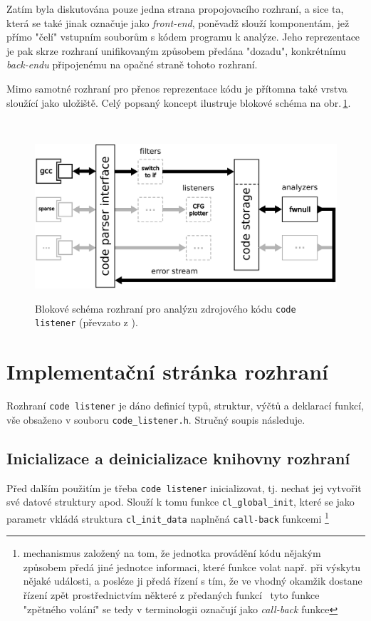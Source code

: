 Zatím byla diskutována pouze jedna strana propojovacího rozhraní, a sice
ta, která se také jinak označuje jako \emph{front-end}, poněvadž slouží
komponentám, jež přímo "čelí" vstupním souborům s kódem programu
k analýze. Jeho reprezentace je pak skrze rozhraní unifikovaným způsobem
předána "dozadu", konkrétnímu \emph{back-endu} připojenému na opačné straně
tohoto rozhraní.

Mimo samotné rozhraní pro přenos reprezentace kódu je přítomna
také vrstva sloužící jako uložiště. Celý popsaný koncept ilustruje
blokové schéma na obr.\,\ref{fig:code-listener:api}.

\hspace*{\fill}\\[-\baselineskip]
\begin{figure}[!h]
    \begin{center}
        \includegraphics[width=1\textwidth,keepaspectratio]{fig/cl-block-diagram}
        \label{fig:code-listener:api}
        \caption{Blokové schéma rozhraní pro analýzu zdrojového kódu
                 \texttt{code listener} (převzato z \cite{web:FITVUTBR:VeriFIT:CodeListener}).}
    \end{center}
\end{figure}


\section{Implementační stránka rozhraní}

Rozhraní \texttt{code listener} je dáno definicí typů, struktur,
výčtů a deklarací funkcí, vše obsaženo v souboru \texttt{code\_listener.h}.
Stručný soupis následuje.

\subsection{Inicializace a deinicializace knihovny rozhraní}
Před dalším použitím je třeba \texttt{code listener} inicializovat,
tj. nechat jej vytvořit své datové struktury apod. Slouží
k tomu funkce \texttt{cl\_global\_init}, které se jako parametr
vkládá struktura \texttt{cl\_init\_data} naplněná \texttt{call-back}
funkcemi%
%
\footnote{mechanismus založený na tom, že jednotka provádění kódu
nějakým způsobem předá jiné jednotce informaci, které funkce
volat např. při výskytu nějaké události, a posléze ji předá řízení
s tím, že ve vhodný okamžik dostane řízení zpět prostřednictvím
některé z předaných funkcí \ndash\ tyto funkce "zpětného volání"
se tedy v terminologii označují jako \emph{call-back} funkce}%
%

